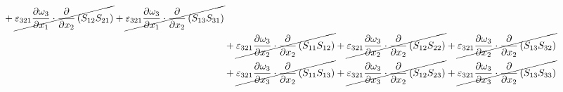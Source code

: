 \begin{equation}
\begin{split}
{}		+\cancel{\varepsilon_{321}\pdv{\omega_{3}}{x_{1}}\cdot\pdv{}{x_{2}}\left(S_{12}S_{21}\right)
}		+\cancel{\varepsilon_{321}\pdv{\omega_{3}}{x_{1}}\cdot\pdv{}{x_{2}}\left(S_{13}S_{31}\right)
}\\ 
		&+\cancel{\varepsilon_{321}\pdv{\omega_{3}}{x_{2}}\cdot\pdv{}{x_{2}}\left(S_{11}S_{12}\right)
}		+\cancel{\varepsilon_{321}\pdv{\omega_{3}}{x_{2}}\cdot\pdv{}{x_{2}}\left(S_{12}S_{22}\right)
}		+\cancel{\varepsilon_{321}\pdv{\omega_{3}}{x_{2}}\cdot\pdv{}{x_{2}}\left(S_{13}S_{32}\right)
}\\ 
		&+\cancel{\varepsilon_{321}\pdv{\omega_{3}}{x_{3}}\cdot\pdv{}{x_{2}}\left(S_{11}S_{13}\right)
}		+\cancel{\varepsilon_{321}\pdv{\omega_{3}}{x_{3}}\cdot\pdv{}{x_{2}}\left(S_{12}S_{23}\right)
}		+\cancel{\varepsilon_{321}\pdv{\omega_{3}}{x_{3}}\cdot\pdv{}{x_{2}}\left(S_{13}S_{33}\right)
}\\ 
	\end{split}
\end{equation}
